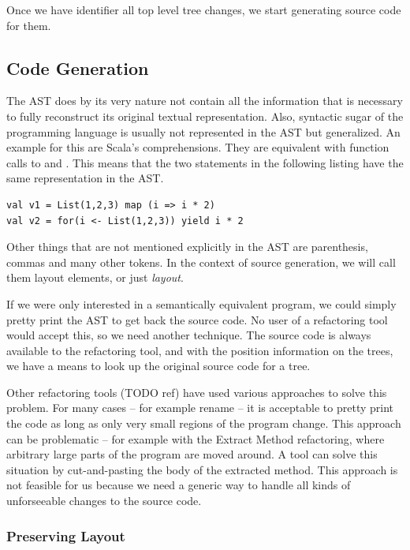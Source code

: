 \documentclass[10pt,a4paper,oneside]{scrreprt}
\begin{document}
Once we have identifier all top level tree changes, we start generating source code for them. 

\subsection{Code Generation}

The AST does by its very nature not contain all the information that is necessary to fully reconstruct its original textual representation. Also, syntactic sugar of the programming language is usually not represented in the AST but generalized. An example for this are Scala's  comprehensions. They are equivalent with function calls to  and . This means that the two statements in the following listing have the same representation in the AST.

\begin{lstlisting}
val v1 = List(1,2,3) map (i => i * 2)
val v2 = for(i <- List(1,2,3)) yield i * 2
\end{lstlisting}

Other things that are not mentioned explicitly in the AST are parenthesis, commas and many other tokens. In the context of source generation, we will call them layout elements, or just \textit{layout}. 

If we were only interested in a semantically equivalent program, we could simply pretty print the AST to get back the source code. No user of a refactoring tool would accept this, so we need another technique. The source code is always available to the refactoring tool, and with the position information on the trees, we have a means to look up the original source code for a tree.

Other refactoring tools (TODO ref) have used various approaches to solve this problem. For many cases -- for example rename -- it is acceptable to pretty print the code as long as only very small regions of the program change. This approach can be problematic -- for example with the Extract Method refactoring, where arbitrary large parts of the program are moved around. A tool can solve this situation by cut-and-pasting the body of the extracted method. This approach is not feasible for us because we need a generic way to handle all kinds of unforseeable changes to the source code.

\subsubsection{Preserving Layout}
\end{document}
